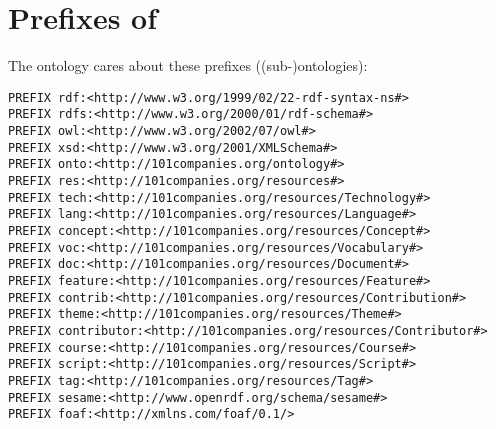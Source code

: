 
\section{Prefixes of \solasote}
\label{S:prefixes}

The ontology cares about these prefixes ((sub-)ontologies):

{\small

\begin{verbatim}
PREFIX rdf:<http://www.w3.org/1999/02/22-rdf-syntax-ns#>
PREFIX rdfs:<http://www.w3.org/2000/01/rdf-schema#>
PREFIX owl:<http://www.w3.org/2002/07/owl#>
PREFIX xsd:<http://www.w3.org/2001/XMLSchema#>
PREFIX onto:<http://101companies.org/ontology#>
PREFIX res:<http://101companies.org/resources#>
PREFIX tech:<http://101companies.org/resources/Technology#>
PREFIX lang:<http://101companies.org/resources/Language#>
PREFIX concept:<http://101companies.org/resources/Concept#>
PREFIX voc:<http://101companies.org/resources/Vocabulary#>
PREFIX doc:<http://101companies.org/resources/Document#>
PREFIX feature:<http://101companies.org/resources/Feature#>
PREFIX contrib:<http://101companies.org/resources/Contribution#>
PREFIX theme:<http://101companies.org/resources/Theme#>
PREFIX contributor:<http://101companies.org/resources/Contributor#>
PREFIX course:<http://101companies.org/resources/Course#>
PREFIX script:<http://101companies.org/resources/Script#>
PREFIX tag:<http://101companies.org/resources/Tag#>
PREFIX sesame:<http://www.openrdf.org/schema/sesame#>
PREFIX foaf:<http://xmlns.com/foaf/0.1/>
\end{verbatim}

}


